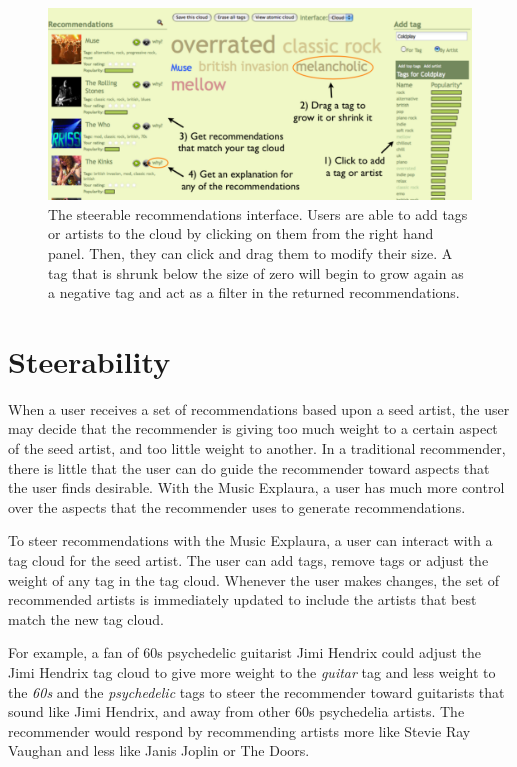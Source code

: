 \documentclass{article}
\begin{document}
\begin{figure}
\begin{center}
\includegraphics[width=1.00\textwidth]{steerable-withtxt}
\end{center}
\caption{The steerable recommendations interface. Users are able to add tags or artists to the cloud by clicking on them from the right hand panel. Then, they can click and drag them to modify their size. A tag that is shrunk below the size of zero will begin to grow again as a negative tag and act as a filter in the returned recommendations.}
\label{steer}
\end{figure}

\label{section:steerable}

\section{Steerability}

When a user receives a set of recommendations based upon a seed artist, 
the user may decide that the recommender is giving too much weight to a
certain aspect of the seed artist, and too little weight to another.
In a traditional recommender, there is little that the user can do
guide the recommender toward aspects that the user finds desirable.
With the Music Explaura, a user has much more control over the aspects
that the recommender uses to generate recommendations.  

To steer recommendations with the Music Explaura, a user can interact
with a tag cloud for the seed artist.  The user can add tags, remove
tags or adjust the weight of any tag in the tag cloud.  Whenever
the user makes changes, the set of recommended artists is
immediately updated to include the artists that best match
the new tag cloud.

For example, a fan of 60s psychedelic guitarist Jimi Hendrix could
adjust the Jimi Hendrix tag cloud to give more weight to the
\textit{guitar} tag and less weight to the \textit{60s} and the
\textit{psychedelic} tags to steer the recommender toward guitarists
that sound like Jimi Hendrix, and away from other 60s psychedelia
artists.  The recommender would respond by recommending artists
more like Stevie Ray Vaughan and less like Janis Joplin or The Doors.
\end{document}
